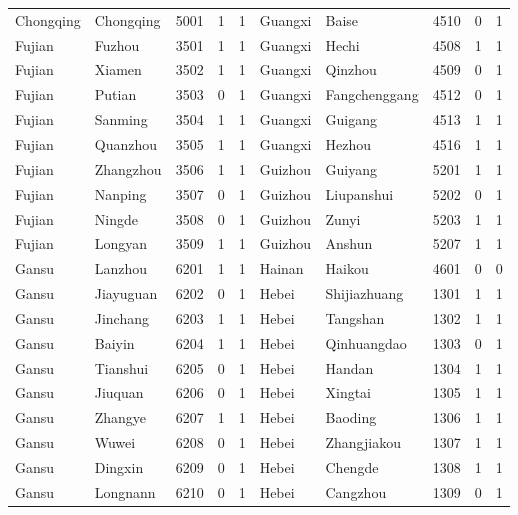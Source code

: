 \documentclass[12pt]{article}
\begin{document}
\begin{table}[!htbp]
\begin{adjustbox}{width=\textwidth, totalheight=\baselineskip,keepaspectratio}
\begin{tabular}{llllllllll}
Chongqing & Chongqing & 5001 & 1   & 1   & Guangxi      & Baise         & 4510 & 0   & 1   \\
Fujian    & Fuzhou    & 3501 & 1   & 1   & Guangxi      & Hechi         & 4508 & 1   & 1   \\
Fujian    & Xiamen    & 3502 & 1   & 1   & Guangxi      & Qinzhou       & 4509 & 0   & 1   \\
Fujian    & Putian    & 3503 & 0   & 1   & Guangxi      & Fangchenggang & 4512 & 0   & 1   \\
Fujian    & Sanming   & 3504 & 1   & 1   & Guangxi      & Guigang       & 4513 & 1   & 1   \\
Fujian    & Quanzhou  & 3505 & 1   & 1   & Guangxi      & Hezhou        & 4516 & 1   & 1   \\
Fujian    & Zhangzhou & 3506 & 1   & 1   & Guizhou      & Guiyang       & 5201 & 1   & 1   \\
Fujian    & Nanping   & 3507 & 0   & 1   & Guizhou      & Liupanshui    & 5202 & 0   & 1   \\
Fujian    & Ningde    & 3508 & 0   & 1   & Guizhou      & Zunyi         & 5203 & 1   & 1   \\
Fujian    & Longyan   & 3509 & 1   & 1   & Guizhou      & Anshun        & 5207 & 1   & 1   \\
Gansu     & Lanzhou   & 6201 & 1   & 1   & Hainan       & Haikou        & 4601 & 0   & 0   \\
Gansu     & Jiayuguan & 6202 & 0   & 1   & Hebei        & Shijiazhuang  & 1301 & 1   & 1   \\
Gansu     & Jinchang  & 6203 & 1   & 1   & Hebei        & Tangshan      & 1302 & 1   & 1   \\
Gansu     & Baiyin    & 6204 & 1   & 1   & Hebei        & Qinhuangdao   & 1303 & 0   & 1   \\
Gansu     & Tianshui  & 6205 & 0   & 1   & Hebei        & Handan        & 1304 & 1   & 1   \\
Gansu     & Jiuquan   & 6206 & 0   & 1   & Hebei        & Xingtai       & 1305 & 1   & 1   \\
Gansu     & Zhangye   & 6207 & 1   & 1   & Hebei        & Baoding       & 1306 & 1   & 1   \\
Gansu     & Wuwei     & 6208 & 0   & 1   & Hebei        & Zhangjiakou   & 1307 & 1   & 1   \\
Gansu     & Dingxin   & 6209 & 0   & 1   & Hebei        & Chengde       & 1308 & 1   & 1   \\
Gansu     & Longnann  & 6210 & 0   & 1   & Hebei        & Cangzhou      & 1309 & 0   & 1   \\

\end{tabular}
\end{adjustbox}
\end{table}
\end{document}
